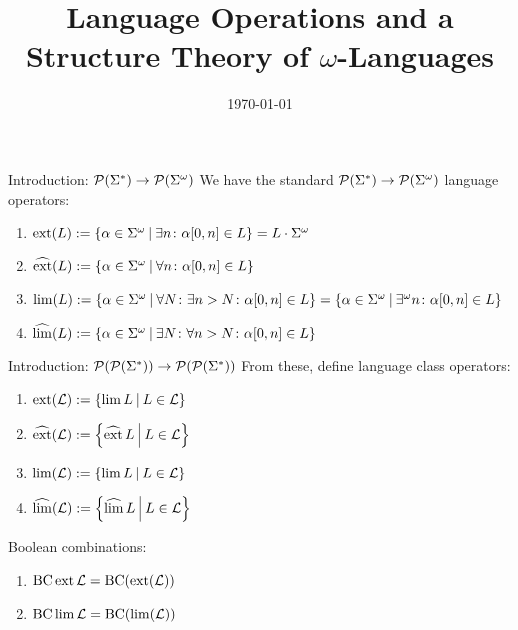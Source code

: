\documentclass[
	notheorems,noamsthm]{beamer}
\title[Kurzform]{Language Operations and a Structure Theory of $\omega$-Languages}
\date{\today}
\begin{document}
\frame{\titlepage}


\begin{frame}[<+->]{Introduction: $\mathcal{P}(\Sigma^*) \rightarrow \mathcal{P}(\Sigma^\omega)$}
We have the standard $\mathcal{P}(\Sigma^*) \rightarrow \mathcal{P}(\Sigma^\omega)$ language operators:

\begin{enumerate}
\item $\ext(L) := \Set{\alpha \in \Sigma^\omega}{ \exists n \colon \alpha[0,n] \in L} = L \cdot \Sigma^\omega$
\item $\dext(L) := \Set{\alpha \in \Sigma^\omega}{ \forall n \colon \alpha[0,n] \in L}$
\item $\lim(L) := \Set{ \alpha \in \Sigma^\omega }{ \forall N \colon \exists n > N \colon \alpha[0,n] \in L } = \Set{ \alpha \in \Sigma^\omega }{ \exists^\omega n \colon \alpha[0,n] \in L }$
\item $\dlim(L) := \Set{ \alpha \in \Sigma^\omega }{ \exists N \colon \forall n > N \colon \alpha[0,n] \in L }$
\end{enumerate}
\end{frame}

\begin{frame}[<+->]{Introduction: $\mathcal{P}(\mathcal{P}(\Sigma^*)) \rightarrow \mathcal{P}(\mathcal{P}(\Sigma^*))$}
From these, define language class operators:

\begin{enumerate}
\item $\ext(\Lang) := \Set{\lim L}{L \in \Lang}$
\item $\dext(\Lang) := \Set{\dext L}{L \in \Lang}$
\item $\lim(\Lang) := \Set{\lim L}{L \in \Lang}$
\item $\dlim(\Lang) := \Set{\dlim L}{L \in \Lang}$
\end{enumerate}

Boolean combinations:
\begin{enumerate}
\item $\operatorname{BC} \operatorname{ext} \mathcal{L} = \operatorname{BC} (\operatorname{ext} (\mathcal{L}))$
\item $\operatorname{BC} \lim \mathcal{L} = \operatorname{BC} (\lim (\mathcal{L}))$
\end{enumerate}


\end{frame}
\end{document}
